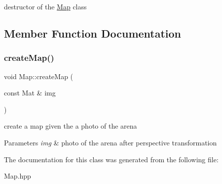 destructor of the \mbox{\hyperlink{class_map}{Map}} class 

\subsection{Member Function Documentation}
\mbox{\label{class_map_a02537656e91e97077dfdfc5d84c3027b}} 
\subsubsection{\texorpdfstring{create\+Map()}{createMap()}}
{\footnotesize\ttfamily void Map\+::create\+Map (\begin{DoxyParamCaption}\item[{const Mat \&}]{img }\end{DoxyParamCaption})}

create a map given the a photo of the arena 
\begin{DoxyParams}{Parameters}
{\em img} & photo of the arena after perspective transformation \\
\hline
\end{DoxyParams}


The documentation for this class was generated from the following file\+:\begin{DoxyCompactItemize}
\item 
Map.\+hpp\end{DoxyCompactItemize}
